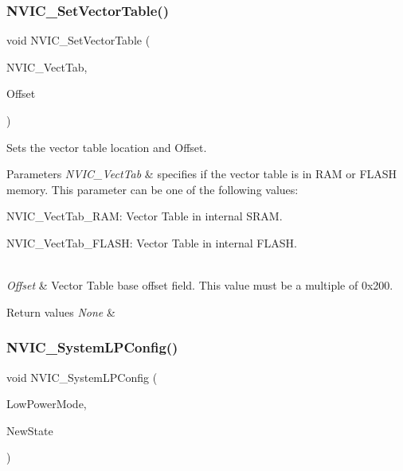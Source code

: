 \subsubsection{\texorpdfstring{N\+V\+I\+C\+\_\+\+Set\+Vector\+Table()}{NVIC\_SetVectorTable()}}
{\footnotesize\ttfamily void N\+V\+I\+C\+\_\+\+Set\+Vector\+Table (\begin{DoxyParamCaption}\item[{uint32\+\_\+t}]{N\+V\+I\+C\+\_\+\+Vect\+Tab,  }\item[{uint32\+\_\+t}]{Offset }\end{DoxyParamCaption})}



Sets the vector table location and Offset. 


\begin{DoxyParams}{Parameters}
{\em N\+V\+I\+C\+\_\+\+Vect\+Tab} & specifies if the vector table is in R\+AM or F\+L\+A\+SH memory. This parameter can be one of the following values\+: \begin{DoxyItemize}
\item N\+V\+I\+C\+\_\+\+Vect\+Tab\+\_\+\+R\+AM\+: Vector Table in internal S\+R\+AM. \item N\+V\+I\+C\+\_\+\+Vect\+Tab\+\_\+\+F\+L\+A\+SH\+: Vector Table in internal F\+L\+A\+SH. \end{DoxyItemize}
\\
\hline
{\em Offset} & Vector Table base offset field. This value must be a multiple of 0x200. \\
\hline
\end{DoxyParams}

\begin{DoxyRetVals}{Return values}
{\em None} & \\
\hline
\end{DoxyRetVals}
\mbox{\label{group___m_i_s_c___private___functions_gae21011c5232f5b8f366acbecd12a1d4a}} 
\subsubsection{\texorpdfstring{N\+V\+I\+C\+\_\+\+System\+L\+P\+Config()}{NVIC\_SystemLPConfig()}}
{\footnotesize\ttfamily void N\+V\+I\+C\+\_\+\+System\+L\+P\+Config (\begin{DoxyParamCaption}\item[{uint8\+\_\+t}]{Low\+Power\+Mode,  }\item[{Functional\+State}]{New\+State }\end{DoxyParamCaption})}



